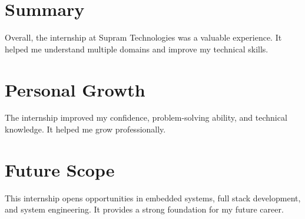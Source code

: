 \documentclass[12pt,a4paper]{report}
\begin{document}
\section{Summary}
Overall, the internship at Supram Technologies was a valuable experience. It helped me understand multiple domains and improve my technical skills.

\section{Personal Growth}
The internship improved my confidence, problem-solving ability, and technical knowledge. It helped me grow professionally.

\section{Future Scope}
This internship opens opportunities in embedded systems, full stack development, and system engineering. It provides a strong foundation for my future career.
\end{document}
